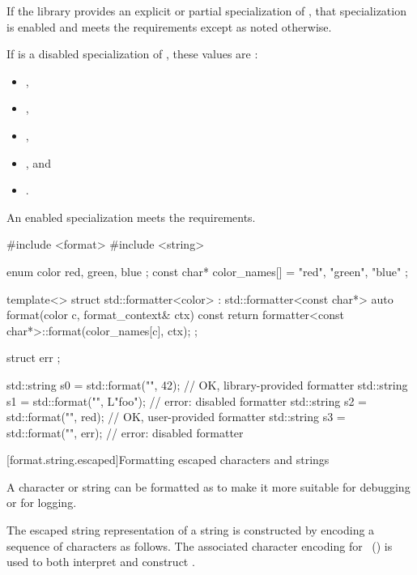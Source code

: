 \pnum
If the library provides an explicit or partial specialization of
, that specialization is enabled
and meets the  requirements
except as noted otherwise.

\pnum
If  is a disabled specialization of , these
values are :
\begin{itemize}
\item {},
\item {},
\item {},
\item {}, and
\item {}.
\end{itemize}

\pnum
An enabled specialization  meets the
 requirements.
\begin{example}
\begin{codeblock}
#include <format>
#include <string>

enum color { red, green, blue };
const char* color_names[] = { "red", "green", "blue" };

template<> struct std::formatter<color> : std::formatter<const char*> {
  auto format(color c, format_context& ctx) const {
    return formatter<const char*>::format(color_names[c], ctx);
  }
};

struct err {};

std::string s0 = std::format("{}", 42);         // OK, library-provided formatter
std::string s1 = std::format("{}", L"foo");     // error: disabled formatter
std::string s2 = std::format("{}", red);        // OK, user-provided formatter
std::string s3 = std::format("{}", err{});      // error: disabled formatter
\end{codeblock}
\end{example}

[format.string.escaped]{Formatting escaped characters and strings}

\pnum
{}%
%
A character or string can be formatted as 
to make it more suitable for debugging or for logging.

\pnum
The escaped string  representation of a string 
is constructed by encoding a sequence of characters as follows.
The associated character encoding 
for ~()
is used to both interpret  and construct .

